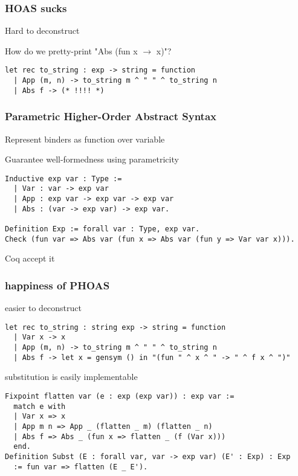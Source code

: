 \documentclass[dvipdfmx,cjk,xcolor=dvipsnames,envcountsect,notheorems,aspectratio=169]{beamer}
\theoremstyle{definition}
\begin{document}
\begin{frame}[fragile]
	\frametitle{HOAS sucks}
	\LARGE Hard to deconstruct

	\vfill
	How do we pretty-print "Abs (fun x $\rightarrow$ x)"?
\begin{lstlisting}
let rec to_string : exp -> string = function
  | App (m, n) -> to_string m ^ " " ^ to_string n
  | Abs f -> (* !!!! *)
\end{lstlisting}
\end{frame}

\begin{frame}[fragile]
	\frametitle{Parametric Higher-Order Abstract Syntax}
	\LARGE Represent binders as function over variable

	Guarantee well-formedness using parametricity
\begin{lstlisting}
Inductive exp var : Type :=
  | Var : var -> exp var
  | App : exp var -> exp var -> exp var
  | Abs : (var -> exp var) -> exp var.

Definition Exp := forall var : Type, exp var.
Check (fun var => Abs var (fun x => Abs var (fun y => Var var x))).
\end{lstlisting}
	Coq accept it
\end{frame}

\begin{frame}[fragile]
	\frametitle{happiness of PHOAS}
	\LARGE easier to deconstruct
\begin{lstlisting}
let rec to_string : string exp -> string = function
  | Var x -> x
  | App (m, n) -> to_string m ^ " " ^ to_string n
  | Abs f -> let x = gensym () in "(fun " ^ x ^ " -> " ^ f x ^ ")"
\end{lstlisting}
	substitution is easily implementable
\begin{lstlisting}
Fixpoint flatten var (e : exp (exp var)) : exp var :=
  match e with
  | Var x => x
  | App m n => App _ (flatten _ m) (flatten _ n)
  | Abs f => Abs _ (fun x => flatten _ (f (Var x)))
  end.
Definition Subst (E : forall var, var -> exp var) (E' : Exp) : Exp
  := fun var => flatten (E _ E').
\end{lstlisting}
\end{frame}
\end{document}

